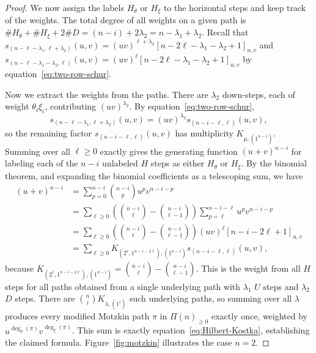 \documentclass[12pt]{amsart}
\theoremstyle{plain}
\theoremstyle{definition}
\begin{document}
\begin{proof}
We now assign the labels $H_\theta$ or $H_\xi$ to the horizontal steps and keep track of the weights.
The total degree of all weights on a given path is
$\#H_\theta + \#H_\xi + 2\#D = (n-i) + 2\lambda_2 = n - \lambda_1 + \lambda_2$.
Recall that $s_{(n-\ell-\lambda_1, \ell+\lambda_2)}(u,v) =(uv)^{\ell+\lambda_2}[n-2\ell-\lambda_1-\lambda_2+1]_{u,v}$ and  
$s_{(n-\ell-\lambda_1 - \lambda_2, \ell)}(u,v) =(uv)^{\ell}[n-2\ell-\lambda_1-\lambda_2+1]_{u,v}$ by equation~\eqref{eq:two-row-schur}.

Now we extract the weights from the paths.
There are $\lambda_2$ down-steps, each of weight $\theta_i\xi_i$, contributing $(uv)^{\lambda_2}$. 
By equation~\eqref{eq:two-row-schur},
\begin{equation}
    s_{(n-\ell-\lambda_1, \ell+\lambda_2)}(u,v) = (uv)^{\lambda_2} s_{(n-i-\ell, \ell)}(u,v),
\end{equation}
so the remaining factor $s_{(n-i-\ell,\ell)}(u,v)$ has multiplicity $K_{\mu,(1^{n-i})}$.
Summing over all $\ell \geq 0$ exactly gives the generating function $(u+v)^{n-i}$ for labeling each of the $n-i$ unlabeled $H$ steps as either $H_\theta$ or $H_\xi$.
By the binomial theorem, and expanding the binomial coefficients as a telescoping sum, we have
\begin{equation}
\begin{aligned}
    (u+v)^{n-i} &= \sum_{p=0}^{n-i} \binom{n-i}{p} u^p v^{n-i-p}\\
    &= \sum_{\ell \geq 0} \left( \binom{n-i}{\ell} - \binom{n-i}{\ell-1 }\right) \sum_{p = \ell}^{n-i-\ell} u^p v^{n-i-p}\\
    &= \sum_{\ell \geq 0} \left( \binom{n-i}{\ell} - \binom{n-i}{\ell-1 }\right) (uv)^\ell [n-i-2\ell+1]_{u,v}\\
    &= \sum_{\ell \geq 0} K_{(2^\ell, 1^{n-i-2\ell}),(1^{n-i})} s_{(n-i-\ell,\ell)}(u,v),
\end{aligned}
\end{equation}
because $K_{(2^\ell, 1^{n-i-2\ell}),(1^{n-i})} = \binom{n-i}{\ell} - \binom{n-i}{\ell-1 }$.
This is the weight from all $H$ steps for all paths obtained from a single underlying path with $\lambda_1$ $U$ steps and $\lambda_2$ $D$ steps.
There are $\binom{n}{i} K_{\lambda,(1^i)}$ such underlying paths, so summing over all $\lambda$ produces every modified Motzkin path $\pi$ in $\Pi(n)_{\geq 0}$ exactly once, weighted by $u^{\deg_\theta(\pi)}v^{\deg_\xi(\pi)}$.
This sum is exactly equation~\eqref{eq:Hilbert-Kostka}, establishing the claimed formula. Figure~\ref{fig:motzkin} illustrates the case $n = 2$.
\end{proof}
\end{document}
